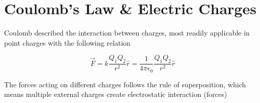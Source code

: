 \chapter{Coulomb's Law \& Electric Charges}

Coulomb described the interaction between charges, most readily applicable in point charges with the following relation

\[\vec{F} = k \frac{Q_1 Q_2}{r^2} \hat{r} = \frac{1}{4\pi\epsilon_0} \frac{Q_1 Q_2}{r^2} \hat{r}\]

The forces acting on different charges follows the rule of superposition, which means multiple external charges create electrostatic interaction (forces) 